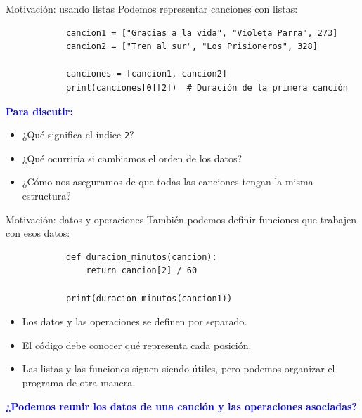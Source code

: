 \documentclass{beamer}
\begin{document}
    \begin{frame}[fragile,t]{Motivación: usando listas}
        Podemos representar canciones con listas:
        \begin{verbatim}
            cancion1 = ["Gracias a la vida", "Violeta Parra", 273]
            cancion2 = ["Tren al sur", "Los Prisioneros", 328]
    
            canciones = [cancion1, cancion2]
            print(canciones[0][2])  # Duración de la primera canción
        \end{verbatim}
        \pause
        \textcolor{blue}{\textbf{Para discutir:}}
        \begin{itemize}
            \item ¿Qué significa el índice \texttt{2}?
            \item ¿Qué ocurriría si cambiamos el orden de los datos?
            \item ¿Cómo nos aseguramos de que todas las canciones tengan la misma estructura?
        \end{itemize}
    \end{frame}
    
    \begin{frame}[fragile,t]{Motivación: datos y operaciones}
        También podemos definir funciones que trabajen con esos datos:
        \begin{verbatim}
            def duracion_minutos(cancion):
                return cancion[2] / 60
            
            print(duracion_minutos(cancion1))
        \end{verbatim}
        \pause
        \begin{itemize}
            \item Los datos y las operaciones se definen por separado.
            \item El código debe conocer qué representa cada posición.
            \item Las listas y las funciones siguen siendo útiles, pero podemos organizar el programa de otra manera.
        \end{itemize}
        \vspace{0.3em}
        \textcolor{blue}{\textbf{¿Podemos reunir los datos de una canción y las operaciones asociadas?}}
    \end{frame}
    
\end{document}
